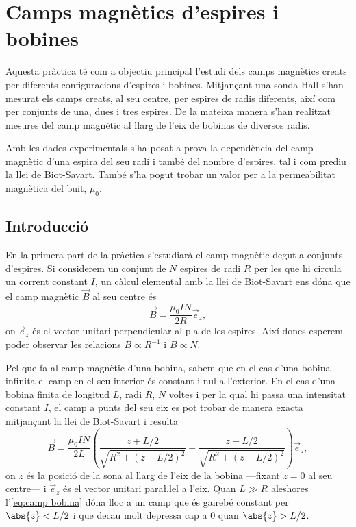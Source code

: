 \chapter{Camps magnètics d'espires i bobines}
\begin{resum}
Aquesta pràctica té com a objectiu principal l'estudi dels camps magnètics creats per diferents configuracions d'espires i bobines. Mitjançant una sonda Hall s'han mesurat els camps creats, al seu centre, per espires de radis diferents, així com per conjunts de una, dues i tres espires. De la mateixa manera s'han realitzat mesures del camp magnètic al llarg de l'eix de bobinas de diversos radis.

Amb les dades experimentals s'ha posat a prova la dependència del camp magnètic d'una espira del seu radi i també del nombre d'espires, tal i com prediu la llei de Biot-Savart. També s'ha pogut trobar un valor per a la permeabilitat magnètica del buit, \( \mu_0 \).
\end{resum}

\section{Introducció}
En la primera part de la pràctica s'estudiarà el camp magnètic degut a conjunts d'espires. Si considerem un conjunt de \( N \) espires de radi \( R \) per les que hi circula un corrent constant \( I \), un càlcul elemental amb la llei de Biot-Savart ens dóna que el camp magnètic \( \vec{B} \) al seu centre és
\begin{equation}\label{eq:camp espira}
  \vec{B}=\frac{\mu_0 I N}{2 R}\vec{e}_z,
\end{equation}
on \( \vec{e}_z \) és el vector unitari perpendicular al pla de les espires. Així doncs esperem poder observar les relacions \( B \propto R^{-1} \) i \( B \propto N \). 

Pel que fa al camp magnètic d'una bobina, sabem que en el cas d'una bobina infinita el camp en el seu interior és constant i nul a l'exterior. En el cas d'una bobina finita de longitud \( L \), radi \( R \), \( N \) voltes i per la qual hi passa una intensitat constant \( I \), el camp a punts del seu eix es pot trobar de manera exacta mitjançant la llei de Biot-Savart i resulta
\begin{equation}\label{eq:camp bobina}
  \vec{B}=\frac{\mu_0 I N}{2 L}\left(\frac{z + L/2}{\sqrt{R^2+(z+L/2)^2}} - \frac{z - L/2}{\sqrt{R^2 + (z - L/2)^2}}\right) \vec{e}_z,
\end{equation}
on \( z \) és la posició de la sona al llarg de l'eix de la bobina ---fixant \( z = 0 \) al seu centre--- i \( \vec{e}_z \) és el vector unitari para\l.lel a l'eix. Quan \( L \gg R \) aleshores l'\cref{eq:camp bobina} dóna lloc a un camp que és gairebé constant per \( \abs{z} < L/2 \) i que decau molt depressa cap a 0 quan \( \abs{z} > L/2 \). 

